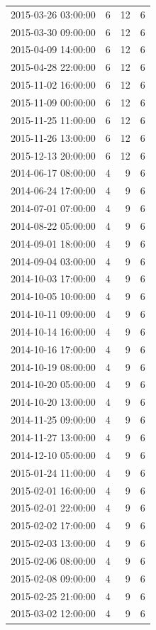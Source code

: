\begin{tabular}{lrrr}
2015-03-26 03:00:00 & 6 & 12 & 6 \\
2015-03-30 09:00:00 & 6 & 12 & 6 \\
2015-04-09 14:00:00 & 6 & 12 & 6 \\
2015-04-28 22:00:00 & 6 & 12 & 6 \\
2015-11-02 16:00:00 & 6 & 12 & 6 \\
2015-11-09 00:00:00 & 6 & 12 & 6 \\
2015-11-25 11:00:00 & 6 & 12 & 6 \\
2015-11-26 13:00:00 & 6 & 12 & 6 \\
2015-12-13 20:00:00 & 6 & 12 & 6 \\
2014-06-17 08:00:00 & 4 & 9 & 6 \\
2014-06-24 17:00:00 & 4 & 9 & 6 \\
2014-07-01 07:00:00 & 4 & 9 & 6 \\
2014-08-22 05:00:00 & 4 & 9 & 6 \\
2014-09-01 18:00:00 & 4 & 9 & 6 \\
2014-09-04 03:00:00 & 4 & 9 & 6 \\
2014-10-03 17:00:00 & 4 & 9 & 6 \\
2014-10-05 10:00:00 & 4 & 9 & 6 \\
2014-10-11 09:00:00 & 4 & 9 & 6 \\
2014-10-14 16:00:00 & 4 & 9 & 6 \\
2014-10-16 17:00:00 & 4 & 9 & 6 \\
2014-10-19 08:00:00 & 4 & 9 & 6 \\
2014-10-20 05:00:00 & 4 & 9 & 6 \\
2014-10-20 13:00:00 & 4 & 9 & 6 \\
2014-11-25 09:00:00 & 4 & 9 & 6 \\
2014-11-27 13:00:00 & 4 & 9 & 6 \\
2014-12-10 05:00:00 & 4 & 9 & 6 \\
2015-01-24 11:00:00 & 4 & 9 & 6 \\
2015-02-01 16:00:00 & 4 & 9 & 6 \\
2015-02-01 22:00:00 & 4 & 9 & 6 \\
2015-02-02 17:00:00 & 4 & 9 & 6 \\
2015-02-03 13:00:00 & 4 & 9 & 6 \\
2015-02-06 08:00:00 & 4 & 9 & 6 \\
2015-02-08 09:00:00 & 4 & 9 & 6 \\
2015-02-25 21:00:00 & 4 & 9 & 6 \\
2015-03-02 12:00:00 & 4 & 9 & 6 \\

\end{tabular}
